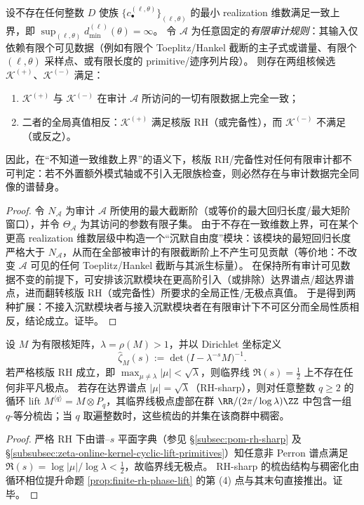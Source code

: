 \begin{theorem}[谱替身：无一致维数上界 \texorpdfstring{$\Longrightarrow$}{=>} 任意有限审计不可判定]\label{thm:xi-spectral-surrogate-finite-audit-undecidable}
设不存在任何整数 \(D\) 使族 \(\{c^{(\ell,\theta)}_\bullet\}_{(\ell,\theta)}\) 的最小 realization 维数满足一致上界，即
\(
\sup_{(\ell,\theta)}d_{\min}^{(\ell)}(\theta)=\infty
\)。
令 \(\mathcal A\) 为任意固定的\emph{有限审计规则}：其输入仅依赖有限个可见数据（例如有限个 Toeplitz/Hankel 截断的主子式或谱量、有限个 \((\ell,\theta)\) 采样点、或有限长度的 primitive/迹序列片段）。
则存在两组核候选 \(\mathcal K^{(+)}\)、\(\mathcal K^{(-)}\) 满足：
\begin{enumerate}
  \item \(\mathcal K^{(+)}\) 与 \(\mathcal K^{(-)}\) 在审计 \(\mathcal A\) 所访问的一切有限数据上完全一致；
  \item 二者的全局真值相反：\(\mathcal K^{(+)}\) 满足核版 RH（或完备性），而 \(\mathcal K^{(-)}\) 不满足（或反之）。
\end{enumerate}
因此，在“不知道一致维数上界”的语义下，核版 RH/完备性对任何有限审计都不可判定：若不外置额外模式轴或不引入无限族检查，则必然存在与审计数据完全同像的谱替身。
\end{theorem}

\begin{proof}
令 \(N_{\mathcal A}\) 为审计 \(\mathcal A\) 所使用的最大截断阶（或等价的最大回归长度/最大矩阶窗口），并令 \(\Theta_{\mathcal A}\) 为其访问的参数有限子集。
由于不存在一致维数上界，可在某个更高 realization 维数层级中构造一个“沉默自由度”模块：该模块的最短回归长度严格大于 \(N_{\mathcal A}\)，从而在全部被审计的有限截断阶上不产生可见贡献（等价地：不改变 \(\mathcal A\) 可见的任何 Toeplitz/Hankel 截断与其派生标量）。
在保持所有审计可见数据不变的前提下，可安排该沉默模块在更高阶引入（或排除）达界谱点/超达界谱点，进而翻转核版 RH（或完备性）所要求的全局正性/无极点真值。
于是得到两种扩展：不接入沉默模块者与接入沉默模块者在有限审计下不可区分而全局性质相反，结论成立。证毕。
\end{proof}

\begin{corollary}\label{cor:xi-critical-line-poles-empty-or-dense}
设 \(M\) 为有限核矩阵，\(\lambda=\rho(M)>1\)，并以 Dirichlet 坐标定义
\[
\widehat{\zeta}_M(s):=\det\!\bigl(I-\lambda^{-s}M\bigr)^{-1}.
\]
若严格核版 RH 成立，即 \(\max_{\mu\neq\lambda}|\mu|<\sqrt{\lambda}\)，则临界线 \(\Re(s)=\tfrac12\) 上不存在任何非平凡极点。
若存在达界谱点 \(|\mu|=\sqrt{\lambda}\)（RH-sharp），则对任意整数 \(q\ge 2\) 的循环 lift \(M^{\langle q\rangle}=M\otimes P_q\)，其临界线极点虚部在群 \(\RR/(2\pi/\log\lambda)\ZZ\) 中包含一组 \(q\)-等分梳齿；当 \(q\) 取遍整数时，这些梳齿的并集在该商群中稠密。
\end{corollary}

\begin{proof}
严格 RH 下由谱--\(s\) 平面字典（参见 \S\ref{subsec:pom-rh-sharp} 及 \S\ref{subsubsec:zeta-online-kernel-cyclic-lift-primitives}）知任意非 Perron 谱点满足 \(\Re(s)=\log|\mu|/\log\lambda<\tfrac12\)，故临界线无极点。
RH-sharp 的梳齿结构与稠密化由循环相位提升命题 \ref{prop:finite-rh-phase-lift} 的第 (4) 点与其末句直接推出。证毕。
\end{proof}
